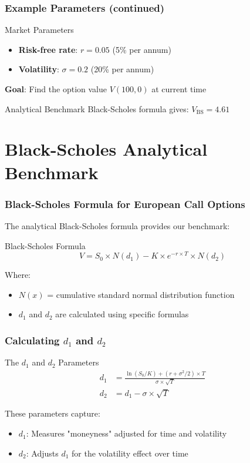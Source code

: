 \documentclass[aspectratio=169]{beamer}
\begin{document}
\begin{frame}
\frametitle{Example Parameters (continued)}
\begin{block}{Market Parameters}
\begin{itemize}
\item \textbf{Risk-free rate}: $r = 0.05$ (5\% per annum)
\item \textbf{Volatility}: $\sigma = 0.2$ (20\% per annum)
\end{itemize}
\end{block}

\textbf{Goal}: Find the option value $V(100, 0)$ at current time

\begin{block}{Analytical Benchmark}
Black-Scholes formula gives: $V_{\text{BS}} = 4.61$
\end{block}
\end{frame}

\section{Black-Scholes Analytical Benchmark}

\begin{frame}
\frametitle{Black-Scholes Formula for European Call Options}
The analytical Black-Scholes formula provides our benchmark:

\begin{block}{Black-Scholes Formula}
\[V = S_0 \times N(d_1) - K \times e^{-r \times T} \times N(d_2)\]
\end{block}

Where:
\begin{itemize}
\item $N(x)$ = cumulative standard normal distribution function
\item $d_1$ and $d_2$ are calculated using specific formulas
\end{itemize}
\end{frame}

\begin{frame}
\frametitle{Calculating $d_1$ and $d_2$}
\begin{block}{The $d_1$ and $d_2$ Parameters}
\begin{align}
d_1 &= \frac{\ln(S_0/K) + (r + \sigma^2/2) \times T}{\sigma \times \sqrt{T}} \\
d_2 &= d_1 - \sigma \times \sqrt{T}
\end{align}
\end{block}

These parameters capture:
\begin{itemize}
\item \textbf{$d_1$}: Measures "moneyness" adjusted for time and volatility
\item \textbf{$d_2$}: Adjusts $d_1$ for the volatility effect over time
\end{itemize}
\end{frame}
\end{document}
